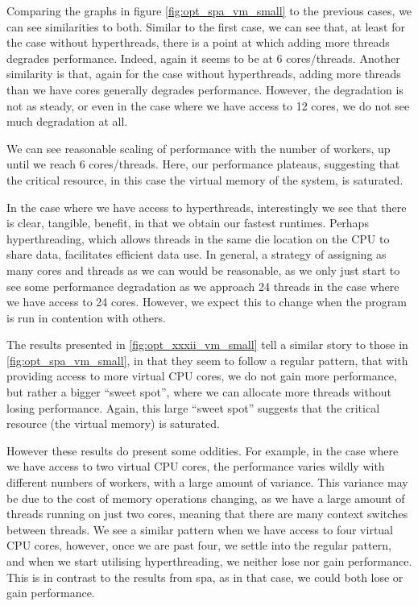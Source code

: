 Comparing the graphs in figure \ref{fig:opt_spa_vm_small} to the previous cases, we can see similarities to both. Similar to the first case, we can see that, at least for the case without hyperthreads, there is a point at which adding more threads degrades performance. Indeed, again it seems to be at 6 cores/threads. Another similarity is that, again for the case without hyperthreads, adding more threads than we have cores generally degrades performance. However, the degradation is not as steady, or even in the case where we have access to 12 cores, we do not see much degradation at all.

We can see reasonable scaling of performance with the number of workers, up until we reach 6 cores/threads. Here, our performance plateaus, suggesting that the critical resource, in this case the virtual memory of the system, is saturated.

In the case where we have access to hyperthreads, interestingly we see that there is clear, tangible, benefit, in that we obtain our fastest runtimes. Perhaps hyperthreading, which allows threads in the same die location on the CPU to share data, facilitates efficient data use. In general, a strategy of assigning as many cores and threads as we can would be reasonable, as we only just start to see some performance degradation as we approach 24 threads in the case where we have access to 24 cores. However, we expect this to change when the program is run in contention with others.



The results presented in \ref{fig:opt_xxxii_vm_small} tell a similar story to those in \ref{fig:opt_spa_vm_small}, in that they seem to follow a regular pattern, that with providing access to more virtual CPU cores, we do not gain more performance, but rather a bigger ``sweet spot'', where we can allocate more threads without losing performance. Again, this large ``sweet spot'' suggests that the critical resource (the virtual memory) is saturated.

However these results do present some oddities. For example, in the case where we have access to two virtual CPU cores, the performance varies wildly with different numbers of workers, with a large amount of variance. This variance may be due to the cost of memory operations changing, as we have a large amount of threads running on just two cores, meaning that there are many context switches between threads. We see a similar pattern when we have access to four virtual CPU cores, however, once we are past four, we settle into the regular pattern, and when we start utilising hyperthreading, we neither lose nor gain performance. This is in contrast to the results from spa, as in that case, we could both lose or gain performance.



